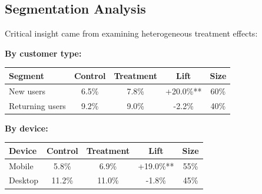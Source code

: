 \subsection{Segmentation Analysis}

Critical insight came from examining heterogeneous treatment effects:

\textbf{By customer type:}

\begin{center}
\begin{tabular}{lcccc}
\toprule
\textbf{Segment} & \textbf{Control} & \textbf{Treatment} & \textbf{Lift} & \textbf{Size} \\
\midrule
New users & 6.5\% & 7.8\% & +20.0\%** & 60\% \\
Returning users & 9.2\% & 9.0\% & -2.2\% & 40\% \\
\bottomrule
\end{tabular}
\end{center}

\textbf{By device:}

\begin{center}
\begin{tabular}{lcccc}
\toprule
\textbf{Device} & \textbf{Control} & \textbf{Treatment} & \textbf{Lift} & \textbf{Size} \\
\midrule
Mobile & 5.8\% & 6.9\% & +19.0\%** & 55\% \\
Desktop & 11.2\% & 11.0\% & -1.8\% & 45\% \\
\bottomrule
\end{tabular}
\end{center}

